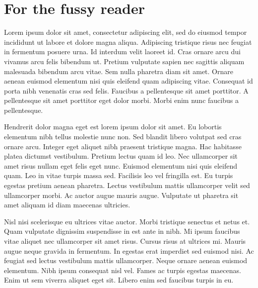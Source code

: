 \chapter{For the fussy reader} \label{AA}
Lorem ipsum dolor sit amet, consectetur adipiscing elit, sed do eiusmod tempor incididunt ut labore et dolore magna aliqua. Adipiscing tristique risus nec feugiat in fermentum posuere urna. Id interdum velit laoreet id. Cras ornare arcu dui vivamus arcu felis bibendum ut. Pretium vulputate sapien nec sagittis aliquam malesuada bibendum arcu vitae. Sem nulla pharetra diam sit amet. Ornare aenean euismod elementum nisi quis eleifend quam adipiscing vitae. Consequat id porta nibh venenatis cras sed felis. Faucibus a pellentesque sit amet porttitor. A pellentesque sit amet porttitor eget dolor morbi. Morbi enim nunc faucibus a pellentesque.

Hendrerit dolor magna eget est lorem ipsum dolor sit amet. Eu lobortis elementum nibh tellus molestie nunc non. Sed blandit libero volutpat sed cras ornare arcu. Integer eget aliquet nibh praesent tristique magna. Hac habitasse platea dictumst vestibulum. Pretium lectus quam id leo. Nec ullamcorper sit amet risus nullam eget felis eget nunc. Euismod elementum nisi quis eleifend quam. Leo in vitae turpis massa sed. Facilisis leo vel fringilla est. Eu turpis egestas pretium aenean pharetra. Lectus vestibulum mattis ullamcorper velit sed ullamcorper morbi. Ac auctor augue mauris augue. Vulputate ut pharetra sit amet aliquam id diam maecenas ultricies.

Nisl nisi scelerisque eu ultrices vitae auctor. Morbi tristique senectus et netus et. Quam vulputate dignissim suspendisse in est ante in nibh. Mi ipsum faucibus vitae aliquet nec ullamcorper sit amet risus. Cursus risus at ultrices mi. Mauris augue neque gravida in fermentum. In egestas erat imperdiet sed euismod nisi. Ac feugiat sed lectus vestibulum mattis ullamcorper. Neque ornare aenean euismod elementum. Nibh ipsum consequat nisl vel. Fames ac turpis egestas maecenas. Enim ut sem viverra aliquet eget sit. Libero enim sed faucibus turpis in eu.
